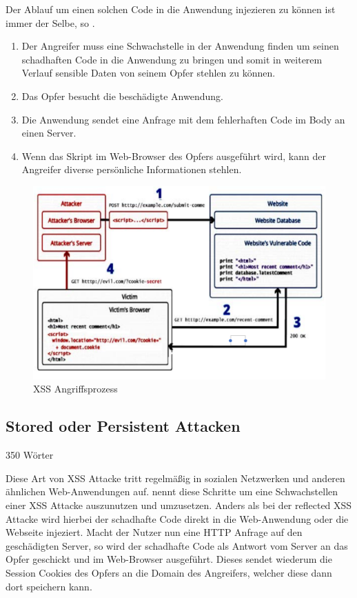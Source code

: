 Der Ablauf um einen solchen Code in die Anwendung injezieren zu können ist immer der Selbe, so \textcite{mahmoud2017}.
\begin{enumerate}
	\item Der Angreifer muss eine Schwachstelle in der Anwendung finden um seinen schadhaften Code in die Anwendung zu bringen und somit in weiterem Verlauf sensible Daten von seinem Opfer stehlen zu können.
	\item Das Opfer besucht die beschädigte Anwendung.
	\item Die Anwendung sendet eine Anfrage mit dem fehlerhaften Code im Body an einen Server.
	\item Wenn das Skript im Web-Browser des Opfers ausgeführt wird, kann der Angreifer diverse persönliche Informationen stehlen.
\end{enumerate}

\begin{figure}[ht]
	\centering
	\includegraphics[width=0.75\linewidth]{images/XSS-attack-process.png}
	\caption{XSS Angriffsprozess\autocite[p]{mahmoud2017}}
\end{figure}


\subsection{Stored oder Persistent Attacken}
\label{subsection:stored attacks} 350 Wörter

Diese Art von XSS Attacke tritt regelmäßig in sozialen Netzwerken und anderen ähnlichen Web-Anwendungen auf. \textcite[2]{mahmoud2017} nennt diese Schritte um eine Schwachstellen einer XSS Attacke auszunutzen und umzusetzen.
Anders als bei der reflected XSS Attacke wird hierbei der schadhafte Code direkt in die Web-Anwendung oder die Webseite injeziert. Macht der Nutzer nun eine HTTP Anfrage auf den geschädigten Server, so wird der schadhafte Code als Antwort vom Server an das Opfer geschickt und im Web-Browser ausgeführt. Dieses sendet wiederum die Session Cookies des Opfers an die Domain des Angreifers, welcher diese dann dort speichern kann.

